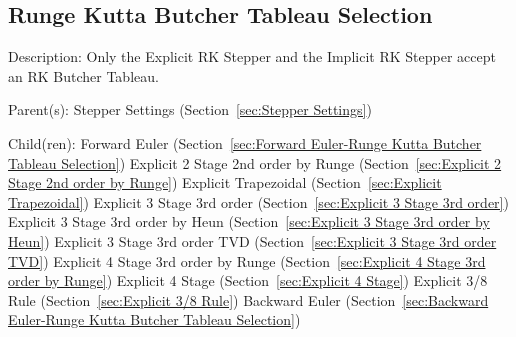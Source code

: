 \subsection{Runge Kutta Butcher Tableau Selection}
\label{sec:Runge Kutta Butcher Tableau Selection}

\begin{list}{}
  {\setlength{\leftmargin}{1.0in}
   \setlength{\labelwidth}{0.75in}
   \setlength{\labelsep}{0.125in}}
  \item[Description:]
    Only the Explicit RK Stepper and the Implicit RK Stepper accept an RK Butcher Tableau.
  \item[Parent(s):]
    Stepper Settings (Section~\ref{sec:Stepper Settings})
  \item[Child(ren):]
    Forward Euler (Section~\ref{sec:Forward Euler-Runge Kutta Butcher Tableau Selection})
      \newline 
    Explicit 2 Stage 2nd order by Runge (Section~\ref{sec:Explicit 2 Stage 2nd order by Runge})
      \newline 
    Explicit Trapezoidal (Section~\ref{sec:Explicit Trapezoidal})
      \newline 
    Explicit 3 Stage 3rd order (Section~\ref{sec:Explicit 3 Stage 3rd order})
      \newline 
    Explicit 3 Stage 3rd order by Heun (Section~\ref{sec:Explicit 3 Stage 3rd order by Heun})
      \newline 
    Explicit 3 Stage 3rd order TVD (Section~\ref{sec:Explicit 3 Stage 3rd order TVD})
      \newline 
    Explicit 4 Stage 3rd order by Runge (Section~\ref{sec:Explicit 4 Stage 3rd order by Runge})
      \newline 
    Explicit 4 Stage (Section~\ref{sec:Explicit 4 Stage})
      \newline 
    Explicit 3/8 Rule (Section~\ref{sec:Explicit 3/8 Rule})
      \newline 
    Backward Euler (Section~\ref{sec:Backward Euler-Runge Kutta Butcher Tableau Selection})

\end{list}
